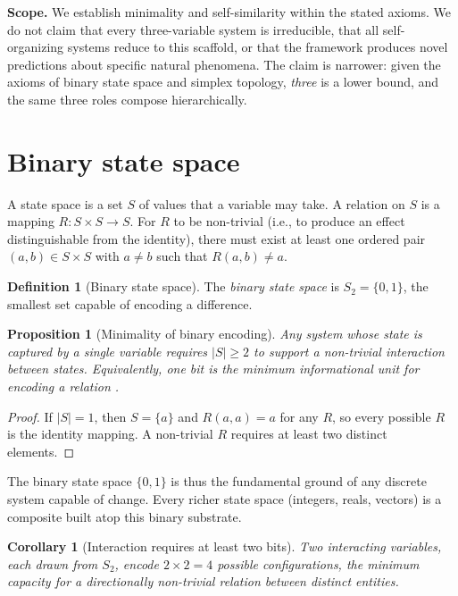 \documentclass[12pt]{article}
\newtheorem{proposition}[theorem]{Proposition}
\newtheorem{corollary}[theorem]{Corollary}
\theoremstyle{definition}
\newtheorem{definition}[theorem]{Definition}
\theoremstyle{remark}
\begin{document}
\textbf{Scope.}  We establish minimality and self-similarity within the stated axioms.
We do not claim that every three-variable system is irreducible, that all self-organizing
systems reduce to this scaffold, or that the framework produces novel predictions about
specific natural phenomena.  The claim is narrower: given the axioms of binary state
space and simplex topology, \emph{three} is a lower bound, and the same three roles
compose hierarchically.

\section{Binary state space}\label{sec:binary}

A state space is a set $S$ of values that a variable may take.  A relation on $S$ is a
mapping $R\colon S \times S \to S$.  For $R$ to be non-trivial (i.e., to produce an
effect distinguishable from the identity), there must exist at least one ordered pair
$(a,b) \in S \times S$ with $a \neq b$ such that $R(a,b) \neq a$.

\begin{definition}[Binary state space]\label{def:binary-space}
The \emph{binary state space} is $S_2 = \{0,1\}$, the smallest set capable of encoding
a difference.
\end{definition}

\begin{proposition}[Minimality of binary encoding]\label{prop:binary-min}
Any system whose state is captured by a single variable requires $|S| \ge 2$ to support
a non-trivial interaction between states.  Equivalently, one bit is the minimum
informational unit for encoding a relation \cite{Sha48}.
\end{proposition}
\begin{proof}
If $|S| = 1$, then $S = \{a\}$ and $R(a,a) = a$ for any $R$, so every possible $R$ is
the identity mapping.  A non-trivial $R$ requires at least two distinct elements.
\end{proof}

The binary state space $\{0,1\}$ is thus the fundamental ground of any discrete system
capable of change.  Every richer state space (integers, reals, vectors) is a composite
built atop this binary substrate.

\begin{corollary}[Interaction requires at least two bits]\label{cor:two-bits}
Two interacting variables, each drawn from $S_2$, encode $2 \times 2 = 4$ possible
configurations, the minimum capacity for a directionally non-trivial relation between
distinct entities.
\end{corollary}
\end{document}
